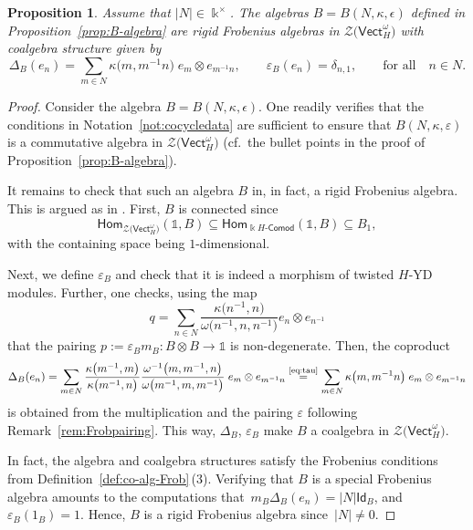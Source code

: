 \documentclass[pdftex]{sigma}
\numberwithin{equation}{section}
\newtheorem{Proposition}[Theorem]{Proposition}
 { \theoremstyle{definition}
\newtheorem{Definition}[Theorem]{Definition}
\newtheorem{Note}[Theorem]{Note}
\newtheorem{Notation}[Theorem]{Notation}
\newtheorem{Example}[Theorem]{Example}
\newtheorem{Remark}[Theorem]{Remark} }
\newcommand{\lcomod}[1]{#1\text{-}\mathsf{Comod}}
\newcommand{\Hom}{\mathsf{Hom}}
\newcommand{\ide}{\mathsf{Id}}
\newcommand{\one}{\mathds{1}}
\newcommand{\Vect}{\mathsf{Vect}}
\newcommand{\cZ}{\mathcal{Z}}
\begin{document}
\begin{Proposition}\label{prop:Brigid}
Assume that $|N| \in \Bbbk^\times$.
The algebras $B=B(N,\kappa, \epsilon)$ defined in Proposition~{\rm \ref{prop:B-algebra}} are rigid Frobenius algebras in $\cZ\big(\Vect_{H}^\omega\big)$ with coalgebra structure given by
 \[\Delta_B(e_n) = \sum_{m\in N}\kappa\big(m,m^{-1}n\big) \;e_{m}\otimes e_{m^{-1}n}, \qquad \varepsilon_B(e_n) = \delta_{n,1}, \qquad \text{for all}\quad n\in N.\]
\end{Proposition}
\begin{proof}

Consider the algebra $B=B(N,\kappa, \epsilon)$. One readily verifies that the conditions in Notation~\ref{not:cocycledata} are sufficient to ensure that $B(N,\kappa,\varepsilon)$ is a commutative algebra in $\cZ\big(\Vect_H^\omega\big)$ (cf.\ the bullet points in the proof of Proposition~\ref{prop:B-algebra}).

It remains to check that such an algebra $B$ in, in fact, a rigid Frobenius algebra. This is argued as in \cite[Proposition~6.12\,(2)]{LW3}. First, $B$ is connected since \[\Hom_{\cZ\big(\Vect_H^\omega\big)}(\one,B)\subseteq \Hom_{\lcomod{\Bbbk H}}(\one,B)\subseteq B_1,\]
with the containing space being $1$-dimensional.



Next, we define $\varepsilon_B$ and check that it is indeed a morphism of twisted $H$-YD modules. Further, one checks, using the map
\[q=\sum_{n\in N}\frac{\kappa\big(n^{-1},n\big)}{\omega\big(n^{-1},n,n^{-1}\big)}e_n\otimes e_{n^{-1}}\]
that the pairing $p:= \varepsilon_B m_B\colon B\otimes B\to \one$ is non-degenerate.
Then, the coproduct
\[\Delta_B(e_n) = \sum_{m\in N}\frac{\kappa\big(m^{-1},m\big)}{\kappa\big(m^{-1},n\big)}\frac{\omega^{-1}\big(m,m^{-1},n\big)}{\omega\big(m^{-1},m,m^{-1}\big)}\;e_{m}\otimes e_{m^{-1}n} \stackrel{\text{\eqref{eq:tau}}}{=}\sum_{m\in N}\kappa\big(m,m^{-1}n\big) \;e_{m}\otimes e_{m^{-1}n}\]
is obtained from the multiplication and the pairing
$\varepsilon$ following Remark~\ref{rem:Frobpairing}.
This way, $\Delta_B$, $\varepsilon_B$ make $B$ a coalgebra in $\cZ\big(\Vect_H^\omega\big)$.

In fact, the algebra and coalgebra structures satisfy the Frobenius conditions from Definition~\ref{def:co-alg-Frob}\,(3). Verifying that $B$ is a special Frobenius algebra amounts to the computations that~$m_B \Delta_B (e_n)=|N|\ide_B$, and $\varepsilon_B(1_B)=1$.
Hence, $B$ is a rigid Frobenius algebra since~$|N|\neq 0$.
\end{proof}
\end{document}
